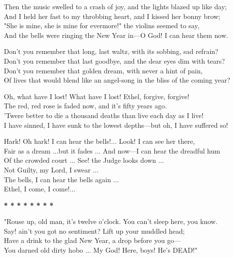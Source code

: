 \begin{poemblock}
Then the music swelled to a crash of joy, and the lights blazed up like day;\\
\idt And I held her fast to my throbbing heart, and I kissed her bonny brow;\\
"She is mine, she is mine for evermore!" the violins seemed to say,\\
\idt And the bells were ringing the New Year in—O God! I can hear them now.

Don't you remember that long, last waltz, with its sobbing, sad refrain?\\
\idt Don't you remember that last goodbye, and the dear eyes dim with tears?\\
Don't you remember that golden dream, with never a hint of pain,\\
\idt Of lives that would blend like an angel-song in the bliss of the coming year?

Oh, what have I lost! What have I lost! Ethel, forgive, forgive!\\
\idt The red, red rose is faded now, and it's fifty years ago.\\
'Twere better to die a thousand deaths than live each day as I live!\\
\idt I have sinned, I have sunk to the lowest depths—but oh, I have suffered so!

Hark! Oh hark! I can hear the bells!... Look! I can see her there,\\
\idt Fair as a dream ...but it fades ... And now—I can hear the dreadful hum\\
Of the crowded court ... See! the Judge looks down ...\\
\idt Not Guilty, my Lord, I swear ...\\
\idt The bells, I can hear the bells again ...\\
\idt Ethel, I come, I come!...

\centerline{\textbf{*   *   *   *   *   *   *   *}}

"Rouse up, old man, it's twelve o'clock. You can't sleep here, you know.\\
\idt Say! ain't you got no sentiment? Lift up your muddled head;\\
Have a drink to the glad New Year, a drop before you go—\\
\idt You darned old dirty hobo ... My God! Here, boys! He's DEAD!"

\end{poemblock}
